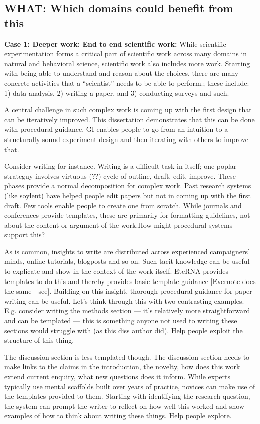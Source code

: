 \subsection{WHAT: Which domains could benefit from this}
\textbf{Case 1: Deeper work: End to end scientific work:}
While scientific experimentation forms a critical part of scientific work across many domains in natural and behavioral science,  scientific work also includes more work. Starting with being able to understand and reason about the choices, there are many concrete activities that a “scientist” needs to be able to perform.; these include: 1) data analysis, 2) writing a paper, and 3) conducting surveys and such. 

A central challenge in such complex work is coming up with the first design that can be iteratively improved. This dissertation demonstrates that this can be done with procedural guidance. GI enables people to go from an intuition to a structurally-sound experiment design and then iterating with others to improve that. 

Consider writing for instance. Writing is a difficult task in itself; one poplar strateguy involves virtuous (??) cycle of outline, draft, edit, improve. These phases provide a normal decomposition for complex work. Past research systems (like soylent) have helped people edit papers but not in coming up with the first draft. Few tools enable people to create one from scratch. While journals and conferences provide templates, these are primarily for formatting guidelines, not about the content or argument of the work.How might procedural systems support this?

As is common, insights to write are distributed across experienced campaigners’ minds, online tutorials, blogposts and so on. Such tacit knowledge can be useful to explicate and show in the context of the work itself. EteRNA provides templates to do this and thereby provides basic template guidance [Evernote does the same - see]. Building on this insight, thorough procedural guidance for paper writing can be useful. Let’s think through this with two contrasting examples. E.g. consider writing the methods section — it’s relatively more straightforward and can be templated — this is something anyone not used to writing these sections would struggle with (as this diss author did). Help people exploit the structure of this thing.

The discussion section is less templated though. The discussion section needs to make links to the claims in the introduction, the novelty, how does this work extend current enquiry, what new questions does it inform. While experts typically use mental scaffolds built over years of practice, novices can make use of the templates provided to them.  Starting with identifying the research question, the system can prompt the writer to reflect on how well this worked and show examples of how to think about writing these things. Help people explore.

